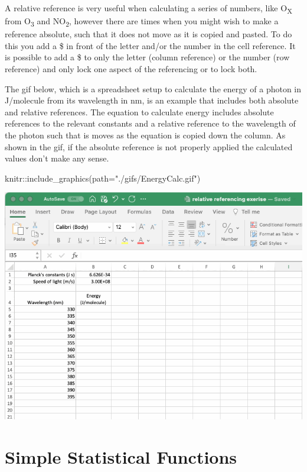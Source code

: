 \documentclass[
]{book}
\newenvironment{Shaded}{\begin{snugshade}}{\end{snugshade}}
\newcommand{\AttributeTok}[1]{\textcolor[rgb]{0.77,0.63,0.00}{#1}}
\newcommand{\FunctionTok}[1]{\textcolor[rgb]{0.00,0.00,0.00}{#1}}
\newcommand{\NormalTok}[1]{#1}
\newcommand{\SpecialCharTok}[1]{\textcolor[rgb]{0.00,0.00,0.00}{#1}}
\newcommand{\StringTok}[1]{\textcolor[rgb]{0.31,0.60,0.02}{#1}}
\begin{document}
A relative reference is very useful when calculating a series of numbers, like O\textsubscript{X} from O\textsubscript{3} and NO\textsubscript{2}, however there are times when you might wish to make a reference absolute, such that it does not move as it is copied and pasted. To do this you add a \$ in front of the letter and/or the number in the cell reference. It is possible to add a \$ to only the letter (column reference) or the number (row reference) and only lock one aspect of the referencing or to lock both.

The gif below, which is a spreadsheet setup to calculate the energy of a photon in J/molecule from its wavelength in nm, is an example that includes both absolute and relative references. The equation to calculate energy includes absolute references to the relevant constants and a relative reference to the wavelength of the photon such that is moves as the equation is copied down the column. As shown in the gif, if the absolute reference is not properly applied the calculated values don't make any sense.

\begin{Shaded}
\begin{Highlighting}[]
\NormalTok{knitr}\SpecialCharTok{::}\FunctionTok{include\_graphics}\NormalTok{(}\AttributeTok{path=}\StringTok{"./gifs/EnergyCalc.gif"}\NormalTok{)}
\end{Highlighting}
\end{Shaded}

\includegraphics{./gifs/EnergyCalc.gif}

\hypertarget{simple-statistical-functions}{%
\section{Simple Statistical Functions}\label{simple-statistical-functions}}
\end{document}
